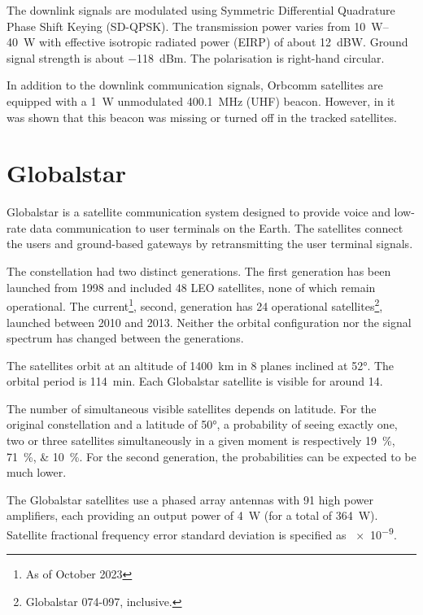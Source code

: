 The downlink signals are modulated using Symmetric Differential Quadrature Phase Shift Keying (SD-QPSK). The transmission power varies from \qtyrange{10}{40}{W} with effective isotropic radiated power (EIRP) of about \qty{12}{dBW}. Ground signal strength is about \qty{-118}{dBm}. The polarisation is right-hand circular\cite{sop08, sat11}.

In addition to the downlink communication signals, Orbcomm satellites are equipped with a \qty{1}{W} unmodulated \qty{400.1}{MHz} (UHF) beacon\cite{sat13}. However, in \cite{sop08} it was shown that this beacon was missing or turned off in the tracked satellites.

\section{Globalstar}
Globalstar is a satellite communication system designed to provide voice and low-rate data communication to user terminals on the Earth. The satellites connect the users and ground-based gateways by retransmitting the user terminal signals\cite{sop07, sat14}.

The constellation had two distinct generations. The first generation has been launched from 1998 and included 48 LEO satellites, none of which remain operational. The current\footnote{As of October 2023}, second, generation has 24 operational satellites\footnote{Globalstar 074-097, inclusive.}, launched between 2010 and 2013. Neither the orbital configuration nor the signal spectrum has changed between the generations\cite{sat15}.


The satellites orbit at an altitude of \qty{1400}{km} in 8 planes inclined at \ang{52}. The orbital period is \qty{114}{min}. Each Globalstar satellite is visible for around \qty{14}{\min}\cite{sat14, sat15}.

The number of simultaneous visible satellites depends on latitude. For the original constellation and a latitude of \ang{50}, a probability of seeing exactly one, two or three satellites simultaneously in a given moment is respectively \qtylist{19;71;10}{\percent}\cite{sop07}. For the second generation, the probabilities can be expected to be much lower.

The Globalstar satellites use a phased array antennas with 91 high power amplifiers, each providing an output power of \qty{4}{W} (for a total of \qty{364}{W})\cite{sat14}. Satellite fractional frequency error standard deviation is specified as \num{e-9}\cite{sop07}.


